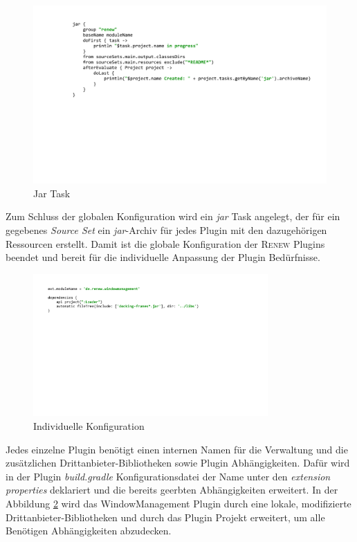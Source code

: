 	\begin{figure}[h!]
	  \centering
	  \includegraphics[width=\textwidth]{material/images/jar.pdf}
	  \caption{Jar Task}
	  \label{fig:jar}
	\end{figure}

	Zum Schluss der globalen Konfiguration wird ein \textit{jar} Task angelegt, der für ein gegebenes \textit{Source Set} ein \textit{jar}-Archiv für jedes Plugin mit den dazugehörigen Ressourcen erstellt.\newline
	Damit ist die globale Konfiguration der \textsc{Renew} Plugins beendet und bereit für die individuelle Anpassung der Plugin Bedürfnisse.\bigbreak

	\begin{figure}[h!]
	  \centering
	  \includegraphics[width=0.8\textwidth]{material/images/gradle/winmangradle.pdf}
	  \caption{Individuelle Konfiguration}
	  \label{fig:windmang}
	\end{figure}

	Jedes einzelne Plugin benötigt einen internen Namen für die Verwaltung und die zusätzlichen Drittanbieter-Bibliotheken sowie Plugin Abhängigkeiten. Dafür wird in der Plugin \textit{build.gradle} Konfigurationsdatei der Name unter den \textit{extension properties} deklariert und die bereits geerbten Abhängigkeiten erweitert. In der Abbildung \ref{fig:windmang} wird das WindowManagement Plugin durch eine lokale, modifizierte Drittanbieter-Bibliotheken und durch das Plugin Projekt erweitert, um alle Benötigen Abhängigkeiten abzudecken.\bigbreak

